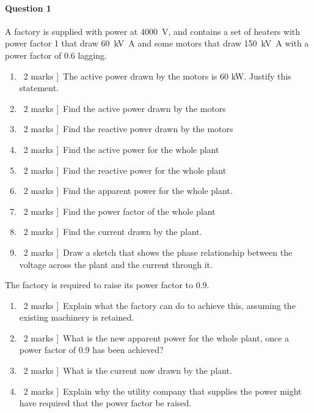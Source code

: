 \documentclass[a4paper,12pt,fleqn]{article}
\begin{document}
\paragraph{\textbf{Question 1}}
A factory is supplied with power at \SI{4000}{\volt}, and contains a set of heaters with power factor 1 that draw \SI{60}{\kilo\volt\ampere} and some motors that draw \SI{150}{\kilo\volt\ampere} with a power factor of 0.6 lagging.
\begin{enumerate}[label=\alph*)]

\item \lbrack\ 2 marks ]\ The active power drawn by the motors is 60 kW. Justify this statement.
\item \lbrack\ 2 marks ]\ Find the active power drawn by the motors
\item \lbrack\ 2 marks ]\ Find the reactive power drawn by the motors
\item \lbrack\ 2 marks ]\ Find the active power for the whole plant
\item \lbrack\ 2 marks ]\ Find the reactive power for the whole plant
\item \lbrack\ 2 marks ]\ Find the apparent power for the whole plant.
\item \lbrack\ 2 marks ]\ Find the power factor of the whole plant
\item \lbrack\ 2 marks ]\ Find the current drawn by the plant.
\item \lbrack\ 2 marks ]\ Draw a sketch that shows the phase relationship between the voltage across the plant and the current through it.
\end{enumerate}

The factory is required to raise its power factor to 0.9. 
\begin{enumerate}[resume,label=\alph*)]

\item \lbrack\ 2 marks ]\ Explain what the factory  can do to achieve this, assuming the existing machinery is retained.
\item \lbrack\ 2 marks ]\ What is the new apparent power for the whole plant, once a power factor of 0.9 has been achieved?
\item \lbrack\ 2 marks ]\ What is the current now drawn by the plant.
\item \lbrack\ 2 marks ]\ Explain why the utility company that supplies the power might have required that the power factor be raised.

\end{enumerate}
\end{document}
